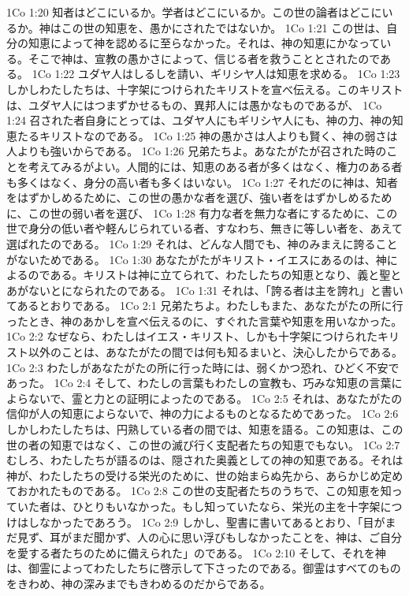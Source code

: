1Co 1:20  知者はどこにいるか。学者はどこにいるか。この世の論者はどこにいるか。神はこの世の知恵を、愚かにされたではないか。
1Co 1:21  この世は、自分の知恵によって神を認めるに至らなかった。それは、神の知恵にかなっている。そこで神は、宣教の愚かさによって、信じる者を救うこととされたのである。
1Co 1:22  ユダヤ人はしるしを請い、ギリシヤ人は知恵を求める。
1Co 1:23  しかしわたしたちは、十字架につけられたキリストを宣べ伝える。このキリストは、ユダヤ人にはつまずかせるもの、異邦人には愚かなものであるが、
1Co 1:24  召された者自身にとっては、ユダヤ人にもギリシヤ人にも、神の力、神の知恵たるキリストなのである。
1Co 1:25  神の愚かさは人よりも賢く、神の弱さは人よりも強いからである。
1Co 1:26  兄弟たちよ。あなたがたが召された時のことを考えてみるがよい。人間的には、知恵のある者が多くはなく、権力のある者も多くはなく、身分の高い者も多くはいない。
1Co 1:27  それだのに神は、知者をはずかしめるために、この世の愚かな者を選び、強い者をはずかしめるために、この世の弱い者を選び、
1Co 1:28  有力な者を無力な者にするために、この世で身分の低い者や軽んじられている者、すなわち、無きに等しい者を、あえて選ばれたのである。
1Co 1:29  それは、どんな人間でも、神のみまえに誇ることがないためである。
1Co 1:30  あなたがたがキリスト・イエスにあるのは、神によるのである。キリストは神に立てられて、わたしたちの知恵となり、義と聖とあがないとになられたのである。
1Co 1:31  それは、「誇る者は主を誇れ」と書いてあるとおりである。
1Co 2:1  兄弟たちよ。わたしもまた、あなたがたの所に行ったとき、神のあかしを宣べ伝えるのに、すぐれた言葉や知恵を用いなかった。
1Co 2:2  なぜなら、わたしはイエス・キリスト、しかも十字架につけられたキリスト以外のことは、あなたがたの間では何も知るまいと、決心したからである。
1Co 2:3  わたしがあなたがたの所に行った時には、弱くかつ恐れ、ひどく不安であった。
1Co 2:4  そして、わたしの言葉もわたしの宣教も、巧みな知恵の言葉によらないで、霊と力との証明によったのである。
1Co 2:5  それは、あなたがたの信仰が人の知恵によらないで、神の力によるものとなるためであった。
1Co 2:6  しかしわたしたちは、円熟している者の間では、知恵を語る。この知恵は、この世の者の知恵ではなく、この世の滅び行く支配者たちの知恵でもない。
1Co 2:7  むしろ、わたしたちが語るのは、隠された奥義としての神の知恵である。それは神が、わたしたちの受ける栄光のために、世の始まらぬ先から、あらかじめ定めておかれたものである。
1Co 2:8  この世の支配者たちのうちで、この知恵を知っていた者は、ひとりもいなかった。もし知っていたなら、栄光の主を十字架につけはしなかったであろう。
1Co 2:9  しかし、聖書に書いてあるとおり、「目がまだ見ず、耳がまだ聞かず、人の心に思い浮びもしなかったことを、神は、ご自分を愛する者たちのために備えられた」のである。
1Co 2:10  そして、それを神は、御霊によってわたしたちに啓示して下さったのである。御霊はすべてのものをきわめ、神の深みまでもきわめるのだからである。
